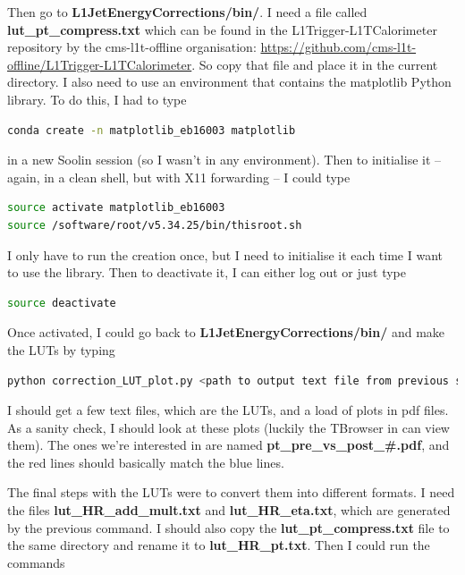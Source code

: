 Then go to \textbf{L1JetEnergyCorrections/bin/}. I need a file called \textbf{lut\_pt\_compress.txt} which can be found in the L1Trigger-L1TCalorimeter repository by the cms-l1t-offline organisation: \url{https://github.com/cms-l1t-offline/L1Trigger-L1TCalorimeter}. So copy that file and place it in the current directory. I also need to use an environment that contains the matplotlib Python library. To do this, I had to type

\begin{lstlisting}[belowskip=-0.7cm, language=sh, numbers=none]
conda create -n matplotlib_eb16003 matplotlib
\end{lstlisting}

in a new Soolin session (so I wasn't in any environment). Then to initialise it -- again, in a clean shell, but with X11 forwarding -- I could type

\begin{lstlisting}[belowskip=-0.7cm, language=sh, numbers=none]
source activate matplotlib_eb16003
source /software/root/v5.34.25/bin/thisroot.sh
\end{lstlisting}

I only have to run the creation once, but I need to initialise it each time I want to use the library. Then to deactivate it, I can either log out or just type

\begin{lstlisting}[belowskip=-0.7cm, language=sh, numbers=none]
source deactivate
\end{lstlisting}

Once activated, I could go back to \textbf{L1JetEnergyCorrections/bin/} and make the LUTs by typing

\begin{lstlisting}[belowskip=-0.7cm, language=sh, numbers=none]
python correction_LUT_plot.py <path to output text file from previous step> <output path>/lut_HR.txt --stage2 --plots --text --ptCompressionFile lut_pt_compress.txt
\end{lstlisting}

I should get a few text files, which are the LUTs, and a load of plots in pdf files. As a sanity check, I should look at these plots (luckily the TBrowser in \ROOT can view them). The ones we're interested in are named \textbf{pt\_pre\_vs\_post\_\#.pdf}, and the red lines should basically match the blue lines. 

The final steps with the LUTs were to convert them into different formats. I need the files \textbf{lut\_HR\_add\_mult.txt} and \textbf{lut\_HR\_eta.txt}, which are generated by the previous command. I should also copy the \textbf{lut\_pt\_compress.txt} file to the same directory and rename it to \textbf{lut\_HR\_pt.txt}. Then I could run the commands

